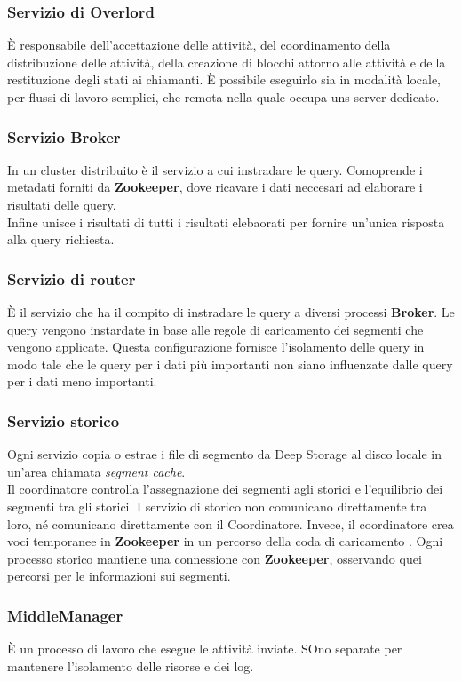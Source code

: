 \documentclass{article}
\begin{document}
\subsubsection{Servizio di Overlord}
 È responsabile dell'accettazione delle attività, del coordinamento della distribuzione delle attività, della creazione di blocchi attorno alle attività e della restituzione degli stati ai chiamanti. È possibile eseguirlo sia in modalità locale, per flussi di lavoro semplici, che remota nella quale occupa uns server dedicato.
 \subsubsection{Servizio Broker}
In un cluster distribuito è il servizio a cui instradare le query. Comoprende i metadati forniti da \textbf{Zookeeper}, dove ricavare i dati neccesari ad elaborare i risultati delle query.\\
Infine unisce i risultati di tutti i risultati elebaorati per fornire un'unica risposta alla query richiesta.
\subsubsection{Servizio di router}
 È il servizio che ha il compito di instradare le query a diversi processi \textbf{Broker}. Le query vengono instardate in base alle regole di caricamento dei segmenti che vengono applicate. Questa configurazione fornisce l'isolamento delle query in modo tale che le query per i dati più importanti non siano influenzate dalle query per i dati meno importanti.
 \subsubsection{Servizio storico}
 Ogni servizio  copia o estrae i file di segmento da Deep Storage al disco locale in un'area chiamata \textit{segment cache}.\\Il coordinatore controlla l'assegnazione dei segmenti agli storici e l'equilibrio dei segmenti tra gli storici.  I servizio di storico non comunicano direttamente tra loro, né comunicano direttamente con il Coordinatore. Invece, il coordinatore crea voci temporanee in \textbf{Zookeeper} in un percorso della coda di caricamento . Ogni processo storico mantiene una connessione con \textbf{Zookeeper}, osservando quei percorsi per le informazioni sui segmenti.
\subsubsection{MiddleManager}
È un processo di lavoro che esegue le attività inviate. SOno separate per mantenere l'isolamento delle risorse e dei log.
\end{document}
